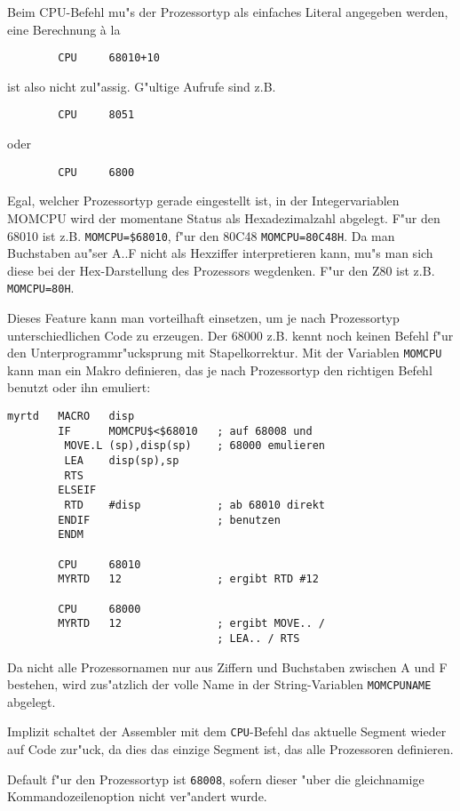 \documentclass[12pt,a4paper,twoside]{report}
\newcommand{\tty}[1]{{\tt #1}}
\begin{document}
{Beim CPU-Befehl mu"s der Prozessortyp als einfaches Literal
angegeben werden, eine Berechnung \`a la
\begin{verbatim}
        CPU     68010+10
\end{verbatim}
ist also nicht zul"assig.  G"ultige Aufrufe sind z.B.
\begin{verbatim}
        CPU     8051
\end{verbatim}
oder
\begin{verbatim}
        CPU     6800
\end{verbatim}
Egal, welcher Prozessortyp gerade eingestellt ist, in der
Integervariablen MOMCPU wird der momentane Status als Hexadezimalzahl
abgelegt.  F"ur den 68010 ist z.B. \tty{MOMCPU=\$68010}, f"ur den 80C48
\tty{MOMCPU=80C48H}.  Da man Buchstaben au"ser A..F nicht als Hexziffer
interpretieren kann, mu"s man sich diese bei der Hex-Darstellung
des Prozessors wegdenken. F"ur den Z80 ist z.B. \tty{MOMCPU=80H}.
\par
Dieses Feature kann
man vorteilhaft einsetzen, um je nach Prozessortyp unterschiedlichen
Code zu erzeugen.  Der 68000 z.B. kennt noch keinen Befehl f"ur den
Unterprogrammr"ucksprung mit Stapelkorrektur.  Mit der Variablen
\tty{MOMCPU} kann man ein Makro definieren, das je nach Prozessortyp den
richtigen Befehl benutzt oder ihn emuliert:
\begin{verbatim}
myrtd   MACRO   disp
        IF      MOMCPU$<$68010   ; auf 68008 und
         MOVE.L (sp),disp(sp)    ; 68000 emulieren
         LEA    disp(sp),sp
         RTS
        ELSEIF
         RTD    #disp            ; ab 68010 direkt
        ENDIF                    ; benutzen
        ENDM

        CPU     68010
        MYRTD   12               ; ergibt RTD #12

        CPU     68000
        MYRTD   12               ; ergibt MOVE.. /
                                 ; LEA.. / RTS
\end{verbatim}
Da nicht alle Prozessornamen nur aus Ziffern und Buchstaben zwischen
A und F bestehen, wird zus"atzlich der volle Name in der
String-Variablen \tty{MOMCPUNAME} abgelegt.
\par
Implizit schaltet der Assembler mit dem \tty{CPU}-Befehl das aktuelle Segment
wieder auf Code zur"uck, da dies das einzige Segment ist, das alle
Prozessoren definieren.
\par
Default f"ur den Prozessortyp ist \tty{68008}, sofern dieser "uber die
gleichnamige Kommandozeilenoption nicht ver"andert wurde.

}
\end{document}
